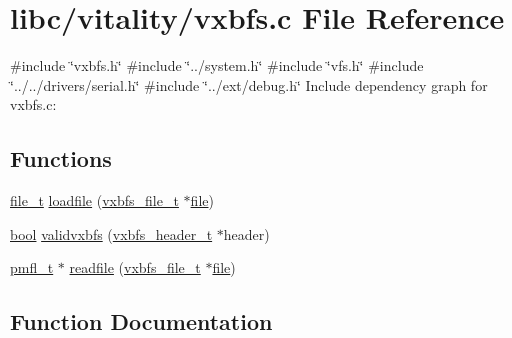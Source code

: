 \hypertarget{a00197}{}\section{libc/vitality/vxbfs.c File Reference}
\label{a00197}
{\ttfamily \#include \char`\"{}vxbfs.\+h\char`\"{}}\newline
{\ttfamily \#include \char`\"{}../system.\+h\char`\"{}}\newline
{\ttfamily \#include \char`\"{}vfs.\+h\char`\"{}}\newline
{\ttfamily \#include \char`\"{}../../drivers/serial.\+h\char`\"{}}\newline
{\ttfamily \#include \char`\"{}../ext/debug.\+h\char`\"{}}\newline
Include dependency graph for vxbfs.\+c\+:
\subsection*{Functions}
\begin{DoxyCompactItemize}
\item 
\hyperlink{a00185_aa5445a6474a23ee3e7756d432dfa4ba1_aa5445a6474a23ee3e7756d432dfa4ba1}{file\+\_\+t} \hyperlink{a00197_afa5caeb58da2ae814ac3adbb167a77fe_afa5caeb58da2ae814ac3adbb167a77fe}{loadfile} (\hyperlink{a00200_abb93e2407af0d8fe0f5629ce6456c6f9_abb93e2407af0d8fe0f5629ce6456c6f9}{vxbfs\+\_\+file\+\_\+t} $\ast$\hyperlink{a00298}{file})
\item 
\hyperlink{a00134_af6a258d8f3ee5206d682d799316314b1_af6a258d8f3ee5206d682d799316314b1}{bool} \hyperlink{a00197_a078a66e7d52fd4a6df768277b605199c_a078a66e7d52fd4a6df768277b605199c}{validvxbfs} (\hyperlink{a00200_ac5678b6d5dd5ed5ca86e5ccd4c30d39d_ac5678b6d5dd5ed5ca86e5ccd4c30d39d}{vxbfs\+\_\+header\+\_\+t} $\ast$header)
\item 
\hyperlink{a00185_a02f7eedc7de6c770b6b29a62905fc61d_a02f7eedc7de6c770b6b29a62905fc61d}{pmfl\+\_\+t} $\ast$ \hyperlink{a00197_a092e5bdd19e8369aa33901fffeb1f025_a092e5bdd19e8369aa33901fffeb1f025}{readfile} (\hyperlink{a00200_abb93e2407af0d8fe0f5629ce6456c6f9_abb93e2407af0d8fe0f5629ce6456c6f9}{vxbfs\+\_\+file\+\_\+t} $\ast$\hyperlink{a00298}{file})
\end{DoxyCompactItemize}


\subsection{Function Documentation}
\mbox{\label{a00197_afa5caeb58da2ae814ac3adbb167a77fe_afa5caeb58da2ae814ac3adbb167a77fe}} 

